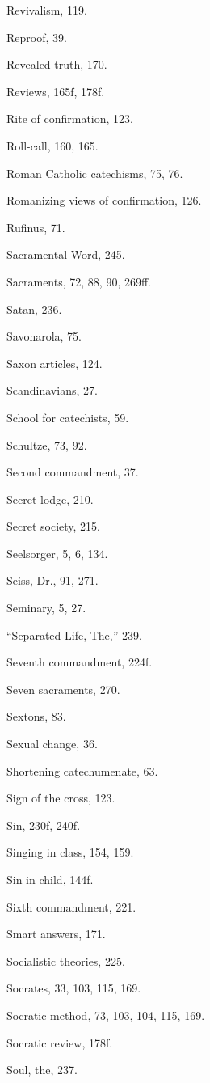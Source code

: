 \begin{originalinhalt}
Revivalism, 119.

Reproof, 39.

Revealed truth, 170.

Reviews, 165f, 178f.

Rite of confirmation, 123.

Roll-call, 160, 165.

Roman Catholic catechisms, 75, 76.

Romanizing views of confirmation, 126.

Rufinus, 71.


Sacramental Word, 245.

Sacraments, 72, 88, 90, 269ff.

Satan, 236.

Savonarola, 75.

Saxon articles, 124.

Scandinavians, 27.

School for catechists, 59.

Schultze, 73, 92.

Second commandment, 37.

Secret lodge, 210.

Secret society, 215.

Seelsorger, 5, 6, 134.

Seiss, Dr., 91, 271.

Seminary, 5, 27.

“Separated Life, The,” 239.

Seventh commandment, 224f.

Seven sacraments, 270.

Sextons, 83.

Sexual change, 36.

Shortening catechumenate, 63.

Sign of the cross, 123.

Sin, 230f, 240f.

Singing in class, 154, 159.

Sin in child, 144f.

Sixth commandment, 221.

Smart answers, 171.

Socialistic theories, 225.

Socrates, 33, 103, 115, 169.

Socratic method, 73, 103, 104, 115, 169.

Socratic review, 178f.

Soul, the, 237.


\end{originalinhalt}
